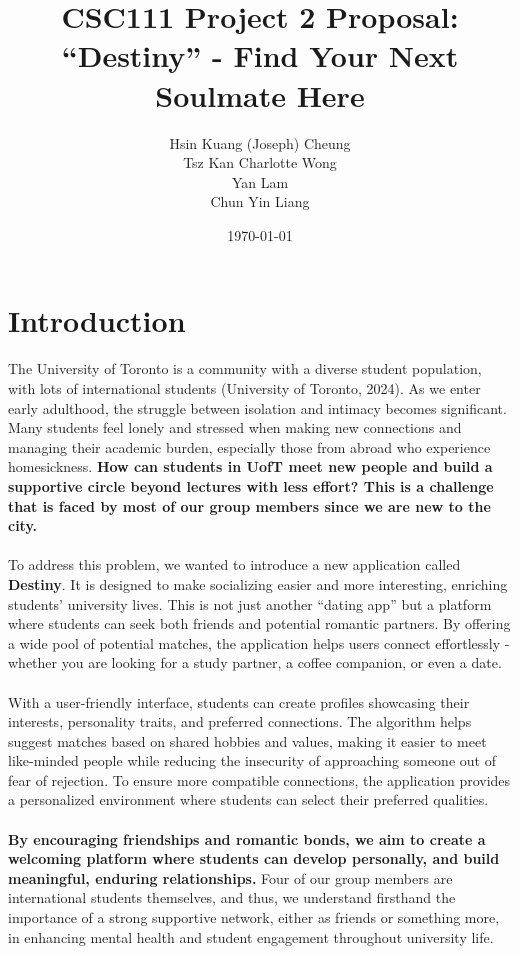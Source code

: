 \documentclass[fontsize=11pt]{article}
\title{CSC111 Project 2 Proposal: \\ \textbf{“Destiny” - Find Your Next Soulmate Here}}
\author{Hsin Kuang (Joseph) Cheung \\ Tsz Kan Charlotte Wong \\ Yan Lam \\ Chun Yin Liang}
\date{\today}
\begin{document}
\maketitle

\section*{Introduction}

The University of Toronto is a community with a diverse student population, with lots of international students (University of Toronto, 2024).
As we enter early adulthood, the struggle between isolation and intimacy becomes significant.
Many students feel lonely and stressed when making new connections and managing their academic burden, especially those from abroad who experience homesickness.
\textbf{How can students in UofT meet new people and build a supportive circle beyond lectures with less effort?
This is a challenge that is faced by most of our group members since we are new to the city.}
\\
\\
To address this problem, we wanted to introduce a new application called \textbf{Destiny}.
It is designed to make socializing easier and more interesting, enriching students’ university lives.
This is not just another “dating app” but a platform where students can seek both friends and potential romantic partners. By offering a wide pool of potential matches, the application helps users connect effortlessly - whether you are looking for a study partner, a coffee companion, or even a date.
\\
\\
With a user-friendly interface, students can create profiles showcasing their interests, personality traits, and preferred connections.
The algorithm helps suggest matches based on shared hobbies and values, making it easier to meet like-minded people while 
reducing the insecurity of approaching someone out of fear of rejection. 
To ensure more compatible connections, the application provides a personalized environment where students can select their preferred qualities.
\\
\\
\textbf{By encouraging friendships and romantic bonds, we aim to create a welcoming platform where students can develop personally, and build meaningful, enduring relationships.}
Four of our group members are international students themselves, and thus, we understand firsthand the importance of a strong supportive network, either as friends or something more, in enhancing mental health and student engagement throughout university life.
\end{document}
